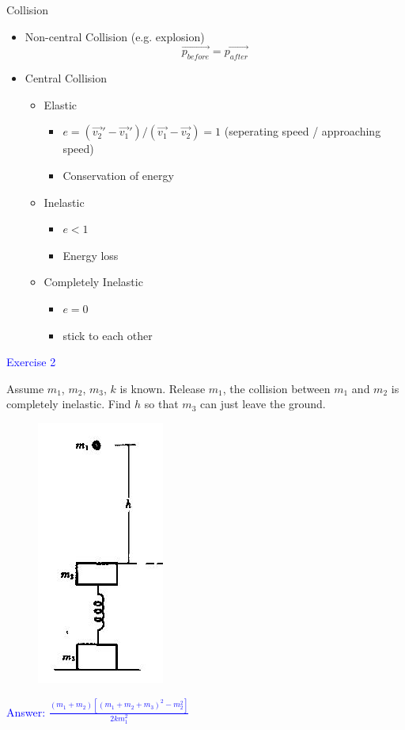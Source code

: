 \documentclass{beamer}
\begin{document}
\begin{frame}{Collision}
  \begin{itemize}
    \item Non-central Collision (e.g. explosion)
    $$\vec{p_{before}} = \vec{p_{after}}$$
    \item Central Collision
    \begin{itemize}
      \item Elastic
      \begin{itemize}
        \item $e = (\vec{v_2}'-\vec{v_1}')/(\vec{v_1}-\vec{v_2})= 1$ (seperating speed / approaching speed)
        \item Conservation of energy
      \end{itemize}
      \item Inelastic
      \begin{itemize}
        \item $e < 1$
        \item Energy loss
      \end{itemize}
      \item Completely Inelastic
      \begin{itemize}
        \item $e = 0$
        \item stick to each other
      \end{itemize}
    \end{itemize}
  \end{itemize}
\end{frame}

\begin{frame}
\textcolor{blue}{Exercise 2}

Assume $m_1$, $m_2$, $m_3$, $k$ is known. Release $m_1$, the collision between $m_1$ and $m_2$ is completely inelastic. Find $h$ so that $m_3$
can just leave the ground.
\begin{figure}[htbp]
\centering
\includegraphics[width=0.2 \linewidth, angle =0]{ex5.png}
\label{fig:3}
\end{figure}
\textcolor{blue}{Answer: $\frac{(m_1+m_2)[(m_1+m_2+m_3)^2-m_2^2]}{2km_1^2}$}
\end{frame}
\end{document}

